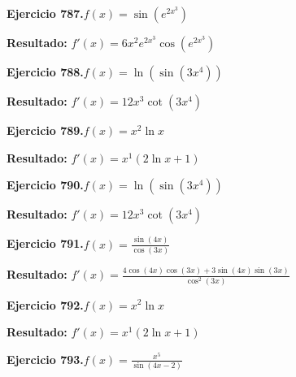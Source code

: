 \documentclass[10pt,a4paper]{article}
\begin{document}
\newpage
\begin{ejbox}
\textbf{Ejercicio 787.}\quad $f(x) = \sin(e^{2x^{3}})$
\end{ejbox}

\begin{solbox}
\textbf{Resultado:} \(\displaystyle f'(x) = 6x^{2}e^{2x^{3}}\cos(e^{2x^{3}})\)
\end{solbox}

\begin{ejbox}
\textbf{Ejercicio 788.}\quad $f(x) = \ln(\sin(3x^{4}))$
\end{ejbox}

\begin{solbox}
\textbf{Resultado:} \(\displaystyle f'(x) = 12x^{3}\cot(3x^{4})\)
\end{solbox}

\begin{ejbox}
\textbf{Ejercicio 789.}\quad $f(x) = x^{2} \ln x$
\end{ejbox}

\begin{solbox}
\textbf{Resultado:} \(\displaystyle f'(x) = x^{1}(2\ln x + 1)\)
\end{solbox}

\newpage
\begin{ejbox}
\textbf{Ejercicio 790.}\quad $f(x) = \ln(\sin(3x^{4}))$
\end{ejbox}

\begin{solbox}
\textbf{Resultado:} \(\displaystyle f'(x) = 12x^{3}\cot(3x^{4})\)
\end{solbox}

\begin{ejbox}
\textbf{Ejercicio 791.}\quad $f(x) = \frac{\sin(4x)}{\cos(3x)}$
\end{ejbox}

\begin{solbox}
\textbf{Resultado:} \(\displaystyle f'(x) = \frac{4\cos(4x)\cos(3x) + 3\sin(4x)\sin(3x)}{\cos^2(3x)}\)
\end{solbox}

\begin{ejbox}
\textbf{Ejercicio 792.}\quad $f(x) = x^{2} \ln x$
\end{ejbox}

\begin{solbox}
\textbf{Resultado:} \(\displaystyle f'(x) = x^{1}(2\ln x + 1)\)
\end{solbox}

\newpage
\begin{ejbox}
\textbf{Ejercicio 793.}\quad $f(x) = \frac{x^{5}}{\sin(4x -2)}$
\end{ejbox}
\end{document}
